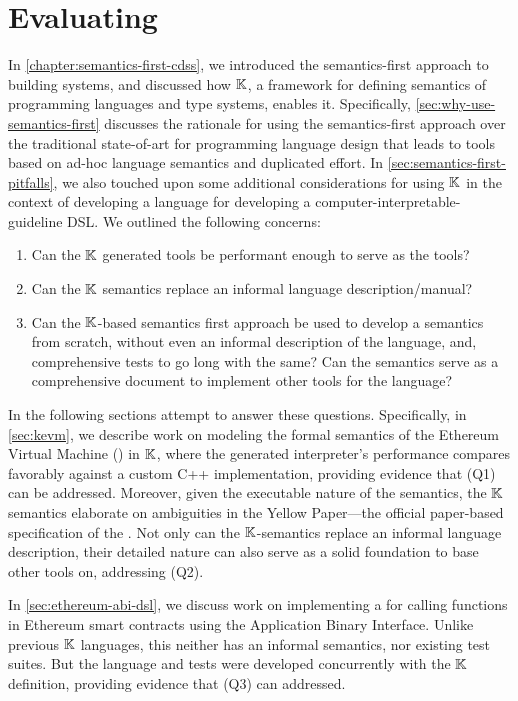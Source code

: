 \chapter{Evaluating \K{}}\label{chapter:evaluating-k}

In \autoref{chapter:semantics-first-cdss}, we introduced the
semantics-first approach to building systems, and discussed how $\mathbb{K}$,
a framework for defining semantics of programming languages and
type systems, enables it. Specifically, \autoref{sec:why-use-semantics-first}
discusses the rationale for using the semantics-first approach over
the traditional state-of-art for programming language design that
leads to tools based on ad-hoc language semantics and duplicated effort.
In \autoref{sec:semantics-first-pitfalls}, we also touched upon
some additional considerations for using $\mathbb{K}$ in the context of
developing a language for developing a computer-interpretable-guideline DSL.
We outlined the following concerns:
\begin{enumerate}[label=(Q\arabic*)]
 \item Can the $\mathbb{K}$ generated tools be performant enough to serve as
 the  tools?
 \item Can the $\mathbb{K}$ semantics replace an informal language description/manual?
 \item Can the $\mathbb{K}$-based semantics first approach be used to develop
 a semantics from scratch, without even an informal description of the language,
  and, comprehensive tests to go long with the same? Can the semantics
  serve as a comprehensive document to implement other tools for the language?
\end{enumerate}
In the following sections attempt to answer these questions.
Specifically, in \autoref{sec:kevm}, we describe work on modeling the
formal semantics of the Ethereum Virtual Machine (\EVM{}) in $\mathbb{K}$, where
the generated interpreter's performance compares favorably against a
custom C++ implementation, providing evidence that (Q1) can be addressed.
Moreover, given the executable nature of the semantics, the $\mathbb{K}$ semantics
elaborate on ambiguities in the Yellow Paper---the official paper-based
specification of the \EVM{}. Not only can the $\mathbb{K}$-semantics replace an informal
language description, their detailed nature can also serve as a solid foundation
to base other tools on, addressing (Q2).

In \autoref{sec:ethereum-abi-dsl}, we discuss work on implementing a
\DSL{} for calling functions in Ethereum smart contracts using the
Application Binary Interface. Unlike previous $\mathbb{K}$ languages, this
\DSL{} neither has an informal semantics, nor existing test suites.
But the language and tests were developed concurrently with the $\mathbb{K}$
definition, providing evidence that (Q3) can addressed.

